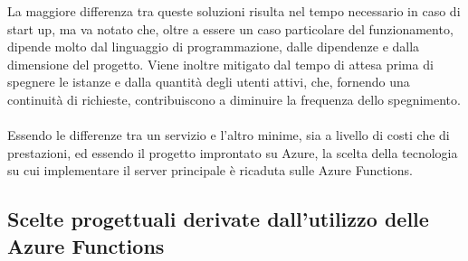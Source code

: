 La maggiore differenza tra queste soluzioni risulta nel tempo necessario in caso di start up,
ma va notato che, oltre a essere un caso particolare del funzionamento,
dipende molto dal linguaggio di programmazione,
dalle dipendenze e dalla dimensione del progetto.
Viene inoltre mitigato dal tempo di attesa prima di spegnere le istanze e
dalla quantità degli utenti attivi,
che, fornendo una continuità di richieste,
 contribuiscono a diminuire la frequenza dello spegnimento.\\
\\
Essendo le differenze tra un servizio e l'altro minime,
sia a livello di costi che di prestazioni,
ed essendo il progetto improntato su Azure,
la scelta della tecnologia su cui implementare il server principale è ricaduta sulle Azure Functions.\\

\subsection{Scelte progettuali derivate dall'utilizzo delle Azure Functions}

